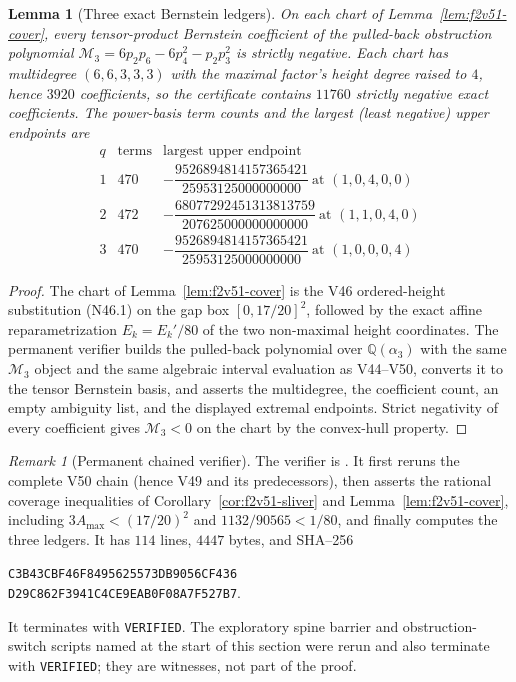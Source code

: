 \documentclass[11pt]{article}
\newtheorem{lemma}[theorem]{Lemma}
\theoremstyle{definition}
\theoremstyle{remark}
\newtheorem{remark}[theorem]{Remark}
\begin{document}
\begin{lemma}[Three exact Bernstein ledgers]
\label{lem:f2v51-ledgers}
On each chart of Lemma~\ref{lem:f2v51-cover}, every tensor-product
Bernstein coefficient of the pulled-back obstruction polynomial
\(\mathcal M_3=6p_2p_6-6p_4^2-p_2p_3^2\) is strictly negative.  Each
chart has multidegree \((6,6,3,3,3)\) with the maximal factor's height
degree raised to \(4\), hence \(3920\) coefficients, so the certificate
contains \(11760\) strictly negative exact coefficients.  The power-basis
term counts and the largest (least negative) upper endpoints are
\begin{equation}
 \begin{array}{c|c|c}
 q&\text{terms}&\text{largest upper endpoint}\\ \hline
 1&470&-\dfrac{9526894814157365421}{25953125000000000}\ \text{at }(1,0,4,0,0)\\
 2&472&-\dfrac{68077292451313813759}{207625000000000000}\ \text{at }(1,1,0,4,0)\\
 3&470&-\dfrac{9526894814157365421}{25953125000000000}\ \text{at }(1,0,0,0,4)
 \end{array}
 \label{eq:f2v51-ledger}
\end{equation}
\end{lemma}

\begin{proof}
The chart of Lemma~\ref{lem:f2v51-cover} is the V46 ordered-height
substitution \textup{(N46.1)} on the gap box \([0,17/20]^2\), followed
by the exact affine reparametrization \(E_k=E_k'/80\) of the two
non-maximal height coordinates.  The permanent verifier builds the
pulled-back polynomial over \(\mathbb Q(\alpha_3)\) with the same
\(\mathcal M_3\) object and the same algebraic interval evaluation as
V44--V50, converts it to the tensor Bernstein basis, and asserts the
multidegree, the coefficient count, an empty ambiguity list, and the
displayed extremal endpoints.  Strict negativity of every coefficient
gives \(\mathcal M_3<0\) on the chart by the convex-hull property.
\end{proof}

\begin{remark}[Permanent chained verifier]
\label{rem:f2v51-verifier}
The verifier is
.  It first
reruns the complete V50 chain (hence V49 and its predecessors), then
asserts the rational coverage inequalities of
Corollary~\ref{cor:f2v51-sliver} and Lemma~\ref{lem:f2v51-cover},
including \(3A_{\max}<(17/20)^2\) and \(1132/90565<1/80\), and finally
computes the three ledgers.  It has \(114\) lines,
\(4447\) bytes, and SHA--256
\begin{center}
\texttt{C3B43CBF46F8495625573DB9056CF436}\\
\texttt{D29C862F3941C4CE9EAB0F08A7F527B7}.
\end{center}
It terminates with \texttt{VERIFIED}.  The exploratory spine barrier
and obstruction-switch scripts named at the start of this section were
rerun and also terminate with \texttt{VERIFIED}; they are witnesses, not
part of the proof.
\end{remark}
\end{document}
